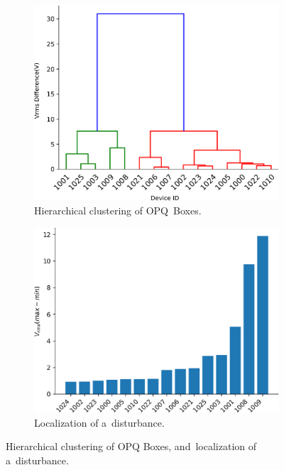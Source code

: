 \documentclass[energies,article,accept,moreauthors,pdftex]{Definitions/mdpi}
\begin{document}
\begin{figure}[H]

\centering
\begin{subfigure}{.5\textwidth}
\centering
\includegraphics[width=0.9\linewidth]{images/pilot/clustring.png}
\caption{Hierarchical clustering of OPQ~Boxes.}
\label{fig:clustering}
\end{subfigure}%
\begin{subfigure}{.5\textwidth}
\centering
\includegraphics[width=0.9\linewidth]{images/pilot/localisation.png}
\caption{Localization of a~disturbance.}
\label{fig:localisation}
\end{subfigure}
\caption{Hierarchical clustering of OPQ Boxes, and~localization of a~disturbance.}
\label{fig:localization-clustering}
\end{figure}
\unskip
\end{document}
